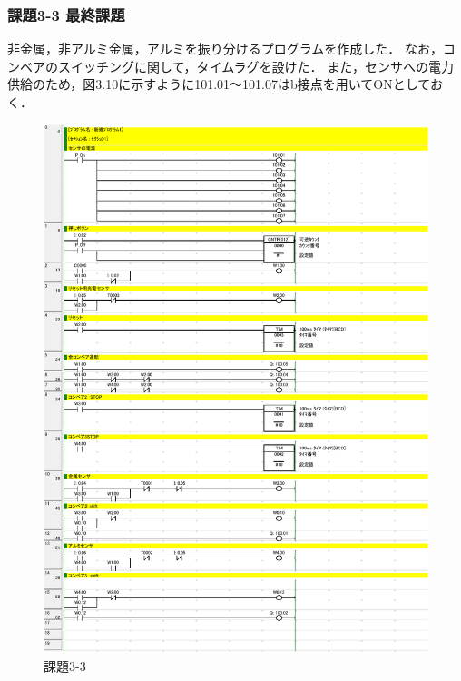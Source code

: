 \subsubsection*{課題3-3 最終課題}
非金属，非アルミ金属，アルミを振り分けるプログラムを作成した．
なお，コンベアのスイッチングに関して，タイムラグを設けた．
また，センサへの電力供給のため，図3.10に示すように101.01〜101.07はb接点を用いてONとしておく．
\begin{figure}[H]
  \centering
  \includegraphics[scale=0.8]{sozai/3-3-crop.pdf}
  \caption{課題3-3}
\end{figure}

